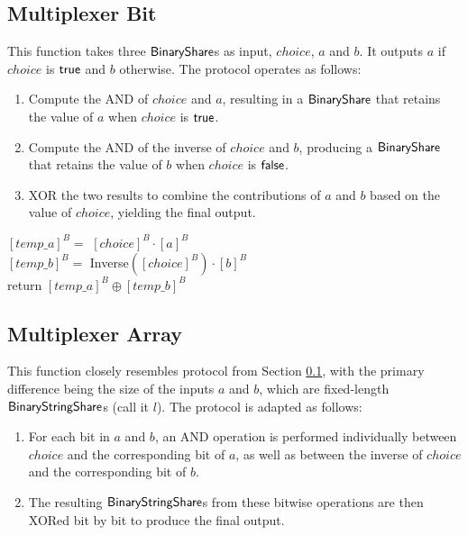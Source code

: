 \subsection{Multiplexer Bit}
\label{sec:multiplexer_bit}

This function takes three ${\mathsf{BinaryShare}}$s as input, $choice$, $a$ and $b$. It outputs $a$ if $choice$ is $\mathsf{true}$ and $b$ otherwise. The protocol operates as follows:

\begin{enumerate}
    \item Compute the AND of $choice$ and $a$, resulting in a ${\mathsf{BinaryShare}}$ that retains the value of $a$ when $choice$ is $\mathsf{true}$.
    \item Compute the AND of the inverse of $choice$ and $b$, producing a ${\mathsf{BinaryShare}}$ that retains the value of $b$ when $choice$ is $\mathsf{false}$.
    \item XOR the two results to combine the contributions of $a$ and $b$ based on the value of $choice$, yielding the final output.
\end{enumerate}

\begin{protocol}[MultiplexerBit$({[choice]^B}, {[a]^B}, {[b]^B})$]
	${[{temp\_a}]^B} =$ ${[choice]^B} \cdot {[a]^B}$\\
	${[{temp\_b}]^B} =$ Inverse$({[choice]^B}) \cdot {[b]^B}$\\
        return ${[{temp\_a}]^B} \oplus {[{temp\_b}]^B}$
\end{protocol}

\subsection{Multiplexer Array}
\label{sec:multiplexer_array}

This function closely resembles protocol from Section \ref{sec:multiplexer_bit}, with the primary difference being the size of the inputs $a$ and $b$, which are fixed-length ${\mathsf{BinaryStringShare}}$s (call it $l$). The protocol is adapted as follows:
\begin{enumerate}
    \item For each bit in $a$ and $b$, an AND operation is performed individually between $choice$ and the corresponding bit of $a$, as well as between the inverse of $choice$ and the corresponding bit of $b$.
    \item The resulting ${\mathsf{BinaryStringShare}}$s from these bitwise operations are then XORed bit by bit to produce the final output.
\end{enumerate}

